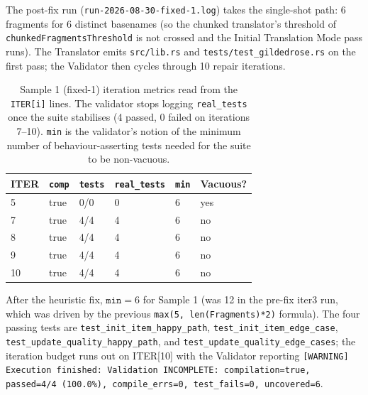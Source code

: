 The post-fix run (\texttt{run-2026-08-30-fixed-1.log}) takes the
single-shot path: 6 fragments for 6 distinct basenames (so the
chunked translator's threshold of
\texttt{chunkedFragmentsThreshold} is not crossed and the Initial
Translation Mode pass runs). The Translator emits
\texttt{src/lib.rs} and \texttt{tests/test\_gildedrose.rs} on the
first pass; the Validator then cycles through 10 repair iterations.

\begin{table}[ht]
\centering
\small
\begin{tabular}{l l l l l l}
\toprule
ITER & \texttt{comp} & \texttt{tests} & \texttt{real\_tests} & \texttt{min} & Vacuous? \\
\midrule
5  & true & 0/0   & 0 & 6 & yes \\
7  & true & 4/4   & 4 & 6 & no  \\
8  & true & 4/4   & 4 & 6 & no  \\
9  & true & 4/4   & 4 & 6 & no  \\
10 & true & 4/4   & 4 & 6 & no  \\
\bottomrule
\end{tabular}
\caption{Sample 1 (fixed-1) iteration metrics read from the
\texttt{ITER[i]} lines. The validator stops logging
\texttt{real\_tests} once the suite stabilises (4 passed, 0 failed
on iterations 7--10). \texttt{min} is the validator's notion of the
minimum number of behaviour-asserting tests needed for the suite to
be non-vacuous.}
\label{tab:sample1}
\end{table}

\noindent
After the heuristic fix, $\texttt{min} = 6$ for Sample 1 (was 12 in
the pre-fix iter3 run, which was driven by the previous
\texttt{max(5, len(Fragments)*2)} formula). The four passing tests
are \texttt{test\_init\_item\_happy\_path},
\texttt{test\_init\_item\_edge\_case},
\texttt{test\_update\_quality\_happy\_path}, and
\texttt{test\_update\_quality\_edge\_cases}; the iteration budget
runs out on ITER[10] with the Validator reporting
\texttt{[WARNING] Execution finished: Validation INCOMPLETE:
compilation=true, passed=4/4 (100.0\%), compile\_errs=0,
test\_fails=0, uncovered=6}.

